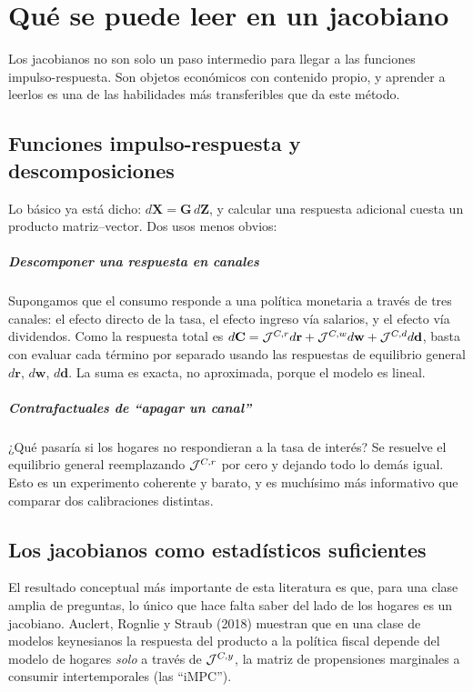 \chapter{Qué se puede leer en un jacobiano}
\label{cap:usos}

Los jacobianos no son solo un paso intermedio para llegar a las funciones
impulso-respuesta. Son objetos económicos con contenido propio, y aprender a
leerlos es una de las habilidades más transferibles que da este método.

\section{Funciones impulso-respuesta y descomposiciones}

Lo básico ya está dicho: $d\mathbf{X} = \mathbf{G}\,d\mathbf{Z}$, y calcular una
respuesta adicional cuesta un producto matriz--vector. Dos usos menos obvios:

\paragraph{Descomponer una respuesta en canales} Supongamos que el consumo
responde a una política monetaria a través de tres canales: el efecto directo de
la tasa, el efecto ingreso vía salarios, y el efecto vía dividendos. Como la
respuesta total es
$d\mathbf{C} = \mathcal{J}^{C,r}d\mathbf{r} + \mathcal{J}^{C,w}d\mathbf{w} + \mathcal{J}^{C,d}d\mathbf{d}$,
basta con evaluar cada término por separado usando las respuestas de equilibrio
general $d\mathbf{r}$, $d\mathbf{w}$, $d\mathbf{d}$. La suma es exacta, no
aproximada, porque el modelo es lineal.

\paragraph{Contrafactuales de ``apagar un canal''} ¿Qué pasaría si los hogares no
respondieran a la tasa de interés? Se resuelve el equilibrio general reemplazando
$\mathcal{J}^{C,r}$ por cero y dejando todo lo demás igual. Esto es un experimento
coherente y barato, y es muchísimo más informativo que comparar dos
calibraciones distintas.

\section{Los jacobianos como estadísticos suficientes}

El resultado conceptual más importante de esta literatura es que, para una clase
amplia de preguntas, lo único que hace falta saber del lado de los hogares es un
jacobiano. Auclert, Rognlie y Straub (2018) muestran que en una clase de modelos
keynesianos la respuesta del producto a la política fiscal depende del modelo de
hogares \emph{solo} a través de $\mathcal{J}^{C,y}$, la matriz de propensiones marginales
a consumir intertemporales (las ``iMPC'').

